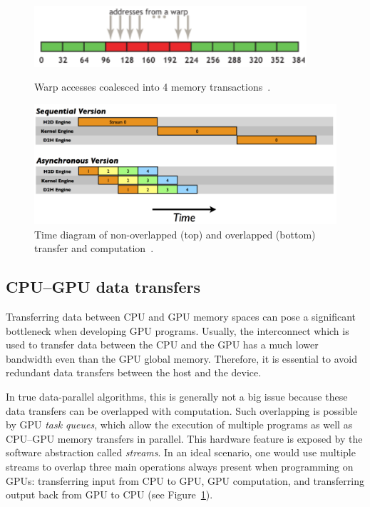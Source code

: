 \begin{figure}[b]
	\centering
	\begin{minipage}{.5\textwidth}
        \centering
        \includegraphics[width=0.9\textwidth]{img/coal1}
        \caption{Warp accesses coalesced into 4 memory transactions~\cite{site:cuda}.}
        \label{fig:coal}
	\end{minipage}%
	\begin{minipage}{.5\textwidth}
        \centering
        \includegraphics[width=\textwidth]{img/C2050Timeline-1024x670.png}
        \caption{Time diagram of non-overlapped (top) and overlapped (bottom) transfer and computation~\cite{site:stream}.}
        \label{fig:transfer}
	\end{minipage}
\end{figure}

\subsection{CPU--GPU data transfers}
\label{sec:transfers}

Transferring data between CPU and GPU memory spaces can pose a significant bottleneck when developing GPU programs. Usually, the interconnect which is used to transfer data between the CPU and the GPU has a much lower bandwidth even than the GPU global memory. Therefore, it is essential to avoid redundant data transfers between the host and the device.

In true data-parallel algorithms, this is generally not a big issue because these data transfers can be overlapped with computation. Such overlapping is possible by GPU \emph{task queues}, which allow the execution of multiple programs as well as CPU--GPU memory transfers in parallel. This hardware feature is exposed by the software abstraction called \emph{streams}. In an ideal scenario, one would use multiple streams to overlap three main operations always present when programming on GPUs: transferring input from CPU to GPU, GPU computation, and transferring output back from GPU to CPU (see Figure~\ref{fig:transfer}).

